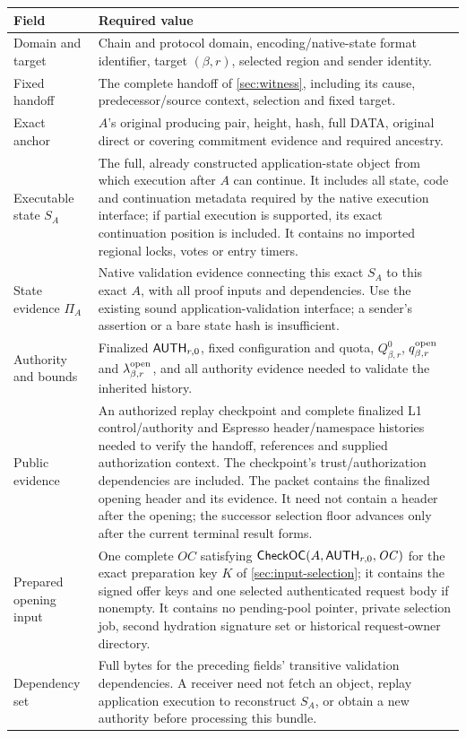 \begin{table}[htbp]\centering\small
\begin{tabularx}{\linewidth}{@{}>{\raggedright\arraybackslash}p{.25\linewidth}Y@{}}\toprule
Field & Required value\\\midrule
Domain and target & Chain and protocol domain, encoding/native-state
format identifier, target $(\beta,r)$, selected region and sender identity.\\
Fixed handoff & The complete handoff of \cref{sec:witness}, including
its cause, predecessor/source context, selection and fixed target.\\
Exact anchor & $A$'s original producing pair, height, hash, full DATA,
original direct or covering commitment evidence and required ancestry.\\
Executable state $S_A$ & The full, already constructed application-state
object from which execution after $A$ can continue. It includes all state,
code and continuation metadata required by the native execution interface;
if partial execution is supported, its exact continuation position is
included. It contains no imported regional locks, votes or entry timers.\\
State evidence $\Pi_A$ & Native validation evidence connecting this exact
$S_A$ to this exact $A$, with all proof inputs and dependencies. Use the
existing sound application-validation interface; a sender's assertion
or a bare state hash is insufficient.\\
Authority and bounds & Finalized $\mathsf{AUTH}_{r,0}$, fixed configuration
and quota, $Q^0_{\beta,r}$, $q^{\rm open}_{\beta,r}$ and
$\lambda^{\rm open}_{\beta,r}$, and all authority evidence needed to
validate the inherited history.\\
Public evidence & An authorized replay checkpoint and complete finalized
L1 control/authority and Espresso header/namespace histories needed to
verify the handoff, references and supplied authorization context. The
checkpoint's trust/authorization dependencies are included. The packet contains the finalized opening header and its evidence.
It need not contain a header after the opening; the successor selection
floor advances only after the current terminal result forms.\\
Prepared opening input & One complete $\mathit{OC}$ satisfying
$\mathsf{CheckOC}(A,\mathsf{AUTH}_{r,0},\mathit{OC})$ for the exact preparation
key $K$ of \cref{sec:input-selection}; it contains the signed offer keys
and one selected authenticated request body if nonempty. It contains no
pending-pool pointer, private selection job, second hydration signature
set or historical request-owner directory.\\
Dependency set & Full bytes for the preceding fields' transitive
validation dependencies. A receiver need not fetch an object, replay
application execution to reconstruct $S_A$, or obtain a new authority
before processing this bundle.\\\bottomrule
\end{tabularx}
\end{table}

